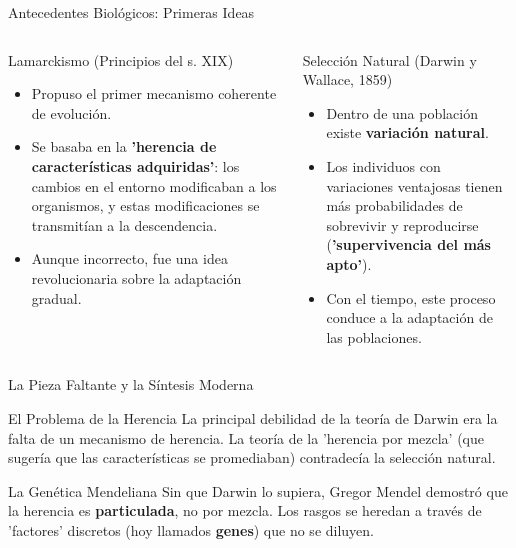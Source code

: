 \documentclass[aspectratio=169,xcolor=dvipsnames]{beamer}
\begin{document}
\begin{frame}{Antecedentes Biológicos: Primeras Ideas}
    \begin{columns}[t]
            \begin{block}{Lamarckismo (Principios del s. XIX)}
                \footnotesize
                \begin{itemize}
                    \item Propuso el primer mecanismo coherente de evolución.
                    \item Se basaba en la \textbf{'herencia de características adquiridas'}: los cambios en el entorno modificaban a los organismos, y estas modificaciones se transmitían a la descendencia.
                    \item Aunque incorrecto, fue una idea revolucionaria sobre la adaptación gradual.
                \end{itemize}
            \end{block}

            \begin{alertblock}{Selección Natural (Darwin y Wallace, 1859)}
                                \footnotesize

                 \begin{itemize}
                    \item Dentro de una población existe \textbf{variación natural}.
                    \item Los individuos con variaciones ventajosas tienen más probabilidades de sobrevivir y reproducirse (\textbf{'supervivencia del más apto'}).
                    \item Con el tiempo, este proceso conduce a la adaptación de las poblaciones.
                \end{itemize}
            \end{alertblock}
    \end{columns}
\end{frame}


\begin{frame}{La Pieza Faltante y la Síntesis Moderna}
    \begin{block}{El Problema de la Herencia}
    La principal debilidad de la teoría de Darwin era la falta de un mecanismo de herencia. La teoría de la 'herencia por mezcla' (que sugería que las características se promediaban) contradecía la selección natural.
    \end{block}
    
    \begin{alertblock}{La Genética Mendeliana}
    Sin que Darwin lo supiera, Gregor Mendel demostró que la herencia es \textbf{particulada}, no por mezcla. Los rasgos se heredan a través de 'factores' discretos (hoy llamados \textbf{genes}) que no se diluyen.
    \end{alertblock}
    
   
\end{frame}
\end{document}
